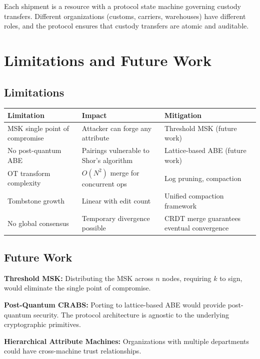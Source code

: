 \documentclass[11pt,a4paper]{article}
\begin{document}
Each shipment is a resource with a protocol state machine governing custody transfers. Different organizations (customs, carriers, warehouses) have different roles, and the protocol ensures that custody transfers are atomic and auditable.

\section{Limitations and Future Work}

\subsection{Limitations}

\vspace{4pt}
\begin{tabularx}{\textwidth}{>{\hsize=0.7\hsize}X>{\hsize=0.8\hsize}X>{\hsize=0.5\hsize}X}
\toprule
\textbf{Limitation} & \textbf{Impact} & \textbf{Mitigation} \\
\midrule
MSK single point of compromise & Attacker can forge any attribute & Threshold MSK (future work) \\
No post-quantum ABE & Pairings vulnerable to Shor's algorithm & Lattice-based ABE (future work) \\
OT transform complexity & $O(N^2)$ merge for concurrent ops & Log pruning, compaction \\
Tombstone growth & Linear with edit count & Unified compaction framework \\
No global consensus & Temporary divergence possible & CRDT merge guarantees eventual convergence \\
\bottomrule
\end{tabularx}

\subsection{Future Work}

\textbf{Threshold MSK:} Distributing the MSK across $n$ nodes, requiring $k$ to sign, would eliminate the single point of compromise.

\textbf{Post-Quantum CRABS:} Porting to lattice-based ABE would provide post-quantum security. The protocol architecture is agnostic to the underlying cryptographic primitives.

\textbf{Hierarchical Attribute Machines:} Organizations with multiple departments could have cross-machine trust relationships.
\end{document}
